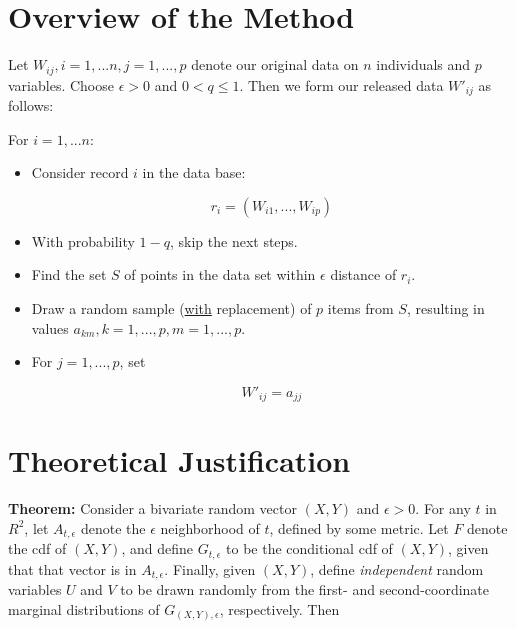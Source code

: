 \documentclass[11pt]{article}
\begin{document}
\section{Overview of the Method}
\label{overview}

Let $W_{ij}, i = 1,...n, j = 1,...,p$ denote our original data on $n$
individuals and $p$ variables.  Choose $\epsilon > 0$ and $0 < q \leq
1$.  Then we form our released data $W'_{ij}$ as follows:

For $i = 1,...n$:

\begin{itemize}

\item Consider record $i$ in the data base:

\begin{equation}
r_i = (W_{i1},...,W_{ip})
\end{equation}

\item With probability $1-q$, skip the next steps.

\item Find the set $S$ of points in the data set within $\epsilon$
distance of $r_i$.

\item Draw a random sample (\underline{with} replacement) of $p$ items
from $S$, resulting in values $a_{km}, k = 1,...,p, m = 1,...,p$.

\item For $j = 1,...,p$, set 

\begin{equation}
W'_{ij} = a_{jj}
\end{equation}

\end{itemize}

\section{Theoretical Justification}

{\bf Theorem:}  Consider a bivariate random vector $(X,Y)$ and $\epsilon >
0$.  For any $t$ in $R^2$, let $A_{t,\epsilon}$ denote the $\epsilon$
neighborhood of $t$, defined by some metric.  Let $F$ denote the
cdf of $(X,Y)$, and define $G_{t,\epsilon}$ to be the
conditional cdf of $(X,Y)$, given that that vector is in
$A_{t,\epsilon}$.  Finally, given $(X,Y)$, define {\it independent}
random variables $U$ and $V$ to be drawn randomly from the first- and
second-coordinate marginal distributions of $G_{(X,Y),\epsilon}$,
respectively.  Then
\end{document}
